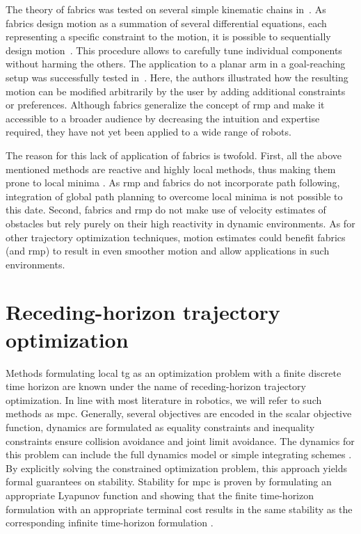 The theory of \ac{fabrics} was tested on several simple
kinematic chains in~\cite{Ratliff2020,Ratliff2021}. As
\ac{fabrics} design motion as a summation of several
differential equations, each representing a specific
constraint to the motion, it is possible to sequentially
design motion~\cite{Ratliff2020}. This procedure allows to
carefully tune individual components without harming the
others. The application to a planar arm in a goal-reaching
setup was successfully tested in~\cite{Ratliff2020}. Here,
the authors illustrated how the resulting motion can be
modified arbitrarily by the user by adding additional
constraints or preferences. Although \ac{fabrics} generalize
the concept of \ac{rmp} and make it accessible to a broader
audience by decreasing the intuition and expertise required,
they have not yet been applied to a wide range of robots. 

The reason for this lack of application of \ac{fabrics} is
twofold. First, all the above mentioned methods are reactive
and highly local methods, thus making them prone to local
minima \cite{bhardwaj2022storm}. As \ac{rmp} and
\ac{fabrics} do not incorporate path following, integration
of global path planning to overcome local minima is not
possible to this date. Second, \ac{fabrics} and \ac{rmp} do
not make use of velocity estimates of obstacles but rely
purely on their high reactivity in dynamic environments. As
for other trajectory optimization techniques, motion
estimates could benefit \ac{fabrics} (and \ac{rmp}) to
result in even smoother motion and allow applications in
such environments. 


\section{Receding-horizon trajectory optimization}%
\label{sec:receding_horizon_trajectory_optimization}

Methods formulating local \ac{tg} as an optimization problem with a finite
discrete time horizon are known under the name of receding-horizon trajectory
optimization. In line with most literature in robotics, we will refer to such
methods as \ac{mpc}.
Generally, several objectives are encoded in the scalar
objective function, dynamics
are formulated as equality constraints and inequality constraints ensure
collision avoidance and joint limit avoidance. The dynamics for this problem can
include the full dynamics model or simple integrating
schemes \cite{hewing2020learning}.
By explicitly solving the constrained optimization problem, this approach yields
formal guarantees on stability. Stability for \ac{mpc} is proven by formulating
an appropriate Lyapunov function and showing that the finite time-horizon
formulation with an appropriate terminal cost results in the same stability as
the corresponding infinite time-horizon formulation
\cite{l1,l4,keerthi1988optimal}. 

